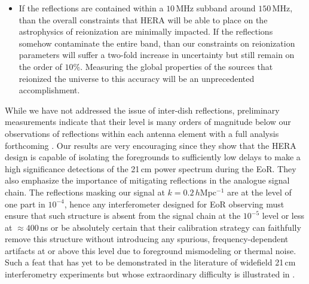 \documentclass[twocolumn]{emulateapj}
\begin{document}
\begin{itemize}
\item If the reflections are contained within a $10$\,MHz subband around $150$\,MHz, than the overall constraints that HERA will be able to place on the astrophysics of reionization are minimally impacted. If the reflections somehow contaminate the entire band, than our constraints on reionization parameters will suffer a two-fold increase in uncertainty but still remain on the order of $10$\%. Measuring the global properties of the sources that reionized the universe to this accuracy will be an unprecedented accomplishment. 
\end{itemize}

While we have not addressed the issue of inter-dish reflections, preliminary measurements indicate that their level is many orders of magnitude below our observations of reflections within each antenna element with a full analysis forthcoming \citep{Patra:2016}. Our results are very encouraging since they show that the HERA design is capable of isolating the foregrounds to sufficiently low delays to make a high significance detections of the 21\,cm power spectrum during the EoR. They also emphasize the importance of mitigating reflections in the analogue signal chain. The reflections masking our signal at $k=0.2$\,$h$Mpc$^{-1}$ are at the level of one part in $10^{-4}$, hence any interferometer designed for EoR observing must ensure that such structure is absent from the signal chain at the $10^{-5}$ level or less at $\approx 400$\,ns or be absolutely certain that their calibration strategy can faithfully remove this structure without introducing any spurious, frequency-dependent artifacts at or above this level due to foreground mismodeling or thermal noise. Such a feat that has yet to be demonstrated in the literature of widefield 21\,cm interferometry experiments but whose extraordinary difficulty is illustrated in \citet{Barry:2016}. 



\end{document}
